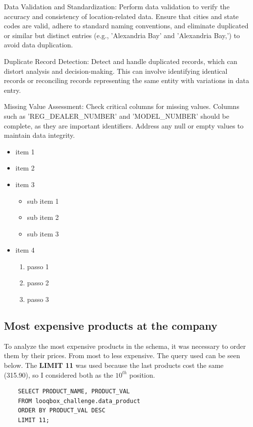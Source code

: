 \documentclass[a4paper, 12pt]{article}
\begin{document}
Data Validation and Standardization: Perform data validation to verify the accuracy and consistency of location-related data. Ensure that cities and state codes are valid, adhere to standard naming conventions, and eliminate duplicated or similar but distinct entries (e.g., 'Alexandria Bay' and 'Alexandria Bay,') to avoid data duplication.

Duplicate Record Detection: Detect and handle duplicated records, which can distort analysis and decision-making. This can involve identifying identical records or reconciling records representing the same entity with variations in data entry.

Missing Value Assessment: Check critical columns for missing values. Columns such as 'REG\_DEALER\_NUMBER' and 'MODEL\_NUMBER' should be complete, as they are important identifiers. Address any null or empty values to maintain data integrity.

\begin{itemize}
    \item item 1
    \item item 2
    \item item 3
      \begin{itemize}
          \item sub item 1 
          \item sub item 2
          \item sub item 3
    \end{itemize}
    \item item 4
        \begin{enumerate}
            \item passo 1
            \item passo 2
            \item passo 3
        \end{enumerate}
\end{itemize}

\newpage
\subsection{Most expensive products at the company}

To analyze the most expensive products in the schema, it was necessary to order them by their prices. From most to less expensive. The query used can be seen below. The \textbf{LIMIT 11} was used because the last products cost the same (315.90), so I considered both as the $10^{th}$ position.

\begin{verbatim}
    SELECT PRODUCT_NAME, PRODUCT_VAL
    FROM looqbox_challenge.data_product
    ORDER BY PRODUCT_VAL DESC
    LIMIT 11;
\end{verbatim}
\end{document}
